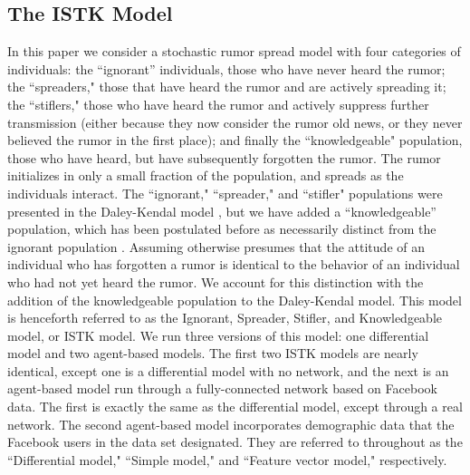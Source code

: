 \subsection{The ISTK Model}
\label{subsec:istk}

In this paper we consider a stochastic rumor spread model with four categories of individuals: the ``ignorant'' individuals, those who have never heard the rumor; the ``spreaders," those that have heard the rumor and are actively spreading it; the ``stiflers," those who have heard the rumor and actively suppress further transmission (either because they now consider the rumor old news, or they never believed the rumor in the first place); and finally the ``knowledgeable" population, those who have heard, but have subsequently forgotten the rumor. The rumor initializes in only a small fraction of the population, and spreads as the individuals interact. The ``ignorant," ``spreader," and ``stifler" populations were presented in the Daley-Kendal model \cite{daley-1965}, but we have added a ``knowledgeable'' population, which has been postulated before as necessarily distinct from the ignorant population \cite{zhao-2012, zhao-2011}. Assuming otherwise presumes that the attitude of an individual who has forgotten a rumor is identical to the behavior of an individual who had not yet heard the rumor. We account for this distinction with the addition of the knowledgeable population to the Daley-Kendal model. This model is henceforth referred to as the Ignorant, Spreader, Stifler, and Knowledgeable model, or ISTK model. We run three versions of this model: one differential model and two agent-based models. The first two ISTK models are nearly identical, except one is a differential model with no network, and the next is an agent-based model run through a fully-connected network based on Facebook data. The first is exactly the same as the differential model, except through a real network. The second agent-based model incorporates demographic data that the Facebook users in the data set designated. They are referred to throughout as the ``Differential model,"  ``Simple model," and ``Feature vector model," respectively.

